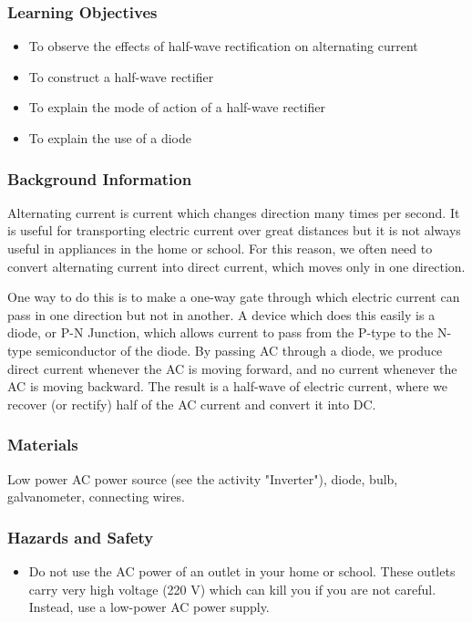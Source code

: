 \subsubsection*{Learning Objectives}
\begin{itemize}
\item{To observe the effects of half-wave rectification on alternating current}
\item{To construct a half-wave rectifier}
\item{To explain the mode of action of a half-wave rectifier}
\item{To explain the use of a diode}
\end{itemize}

\subsubsection*{Background Information}
Alternating current is current which changes direction many times per second.  It is useful for transporting electric current over great distances but it is not always useful in appliances in the home or school.  For this reason, we often need to convert alternating current into direct current, which moves only in one direction.

One way to do this is to make a one-way gate through which electric current can pass in one direction but not in another.  A device which does this easily is a diode, or P-N Junction, which allows current to pass from the P-type to the N-type semiconductor of the diode.  By passing AC through a diode, we produce direct current whenever the AC is moving forward, and no current whenever the AC is moving backward.  The result is a half-wave of electric current, where we recover (or rectify) half of the AC current and convert it into DC.

\subsubsection*{Materials}
Low power AC power source (see the activity "Inverter"), diode, bulb, galvanometer, connecting wires.

\subsubsection*{Hazards and Safety}
\begin{itemize}
\item{Do not use the AC power of an outlet in your home or school.  These outlets carry very high voltage (220 V) which can kill you if you are not careful.  Instead, use a low-power AC power supply.}
\end{itemize}

